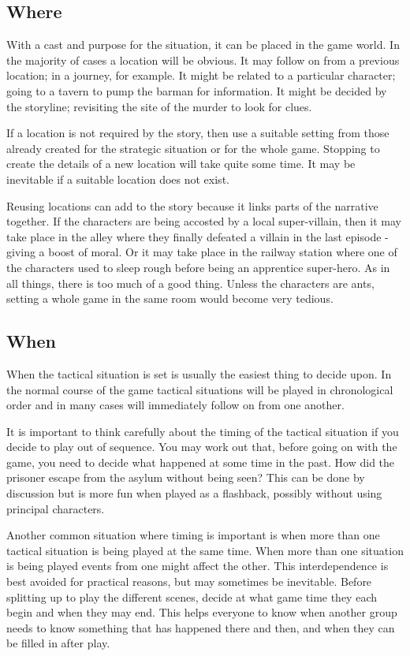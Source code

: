 \documentclass[twoside]{book}
\begin{document}
\subsection{Where}

With a cast and purpose for the situation, it can be placed in the
game world. In the majority of cases a location will be obvious. It
may follow on from a previous location; in a journey, for example. It
might be related to a particular character; going to a tavern to pump
the barman for information. It might be decided by the storyline;
revisiting the site of the murder to look for clues.

If a location is not required by the story, then use a suitable
setting from those already created for the strategic situation or for
the whole game. Stopping to create the details of a new location will
take quite some time. It may be inevitable if a suitable location does
not exist.

Reusing locations can add to the story because it links parts of the
narrative together. If the characters are being accosted by a local
super-villain, then it may take place in the alley where they finally
defeated a villain in the last episode - giving a boost of moral. Or
it may take place in the railway station where one of the characters
used to sleep rough before being an apprentice super-hero. As in all
things, there is too much of a good thing. Unless the characters are
ants, setting a whole game in the same room would become very tedious.

\subsection{When}

When the tactical situation is set is usually the easiest thing to
decide upon. In the normal course of the game tactical situations will
be played in chronological order and in many cases will immediately
follow on from one another.

It is important to think carefully about the timing of the tactical
situation if you decide to play out of sequence. You may work out
that, before going on with the game, you need to decide what happened
at some time in the past. How did the prisoner escape from the asylum
without being seen? This can be done by discussion but is more fun
when played as a flashback, possibly without using principal
characters.

Another common situation where timing is important is when more than
one tactical situation is being played at the same time. When more
than one situation is being played events from one might affect the
other. This interdependence is best avoided for practical reasons, but
may sometimes be inevitable. Before splitting up to play the different
scenes, decide at what game time they each begin and when they may
end. This helps everyone to know when another group needs to know
something that has happened there and then, and when they can be
filled in after play.
\end{document}
